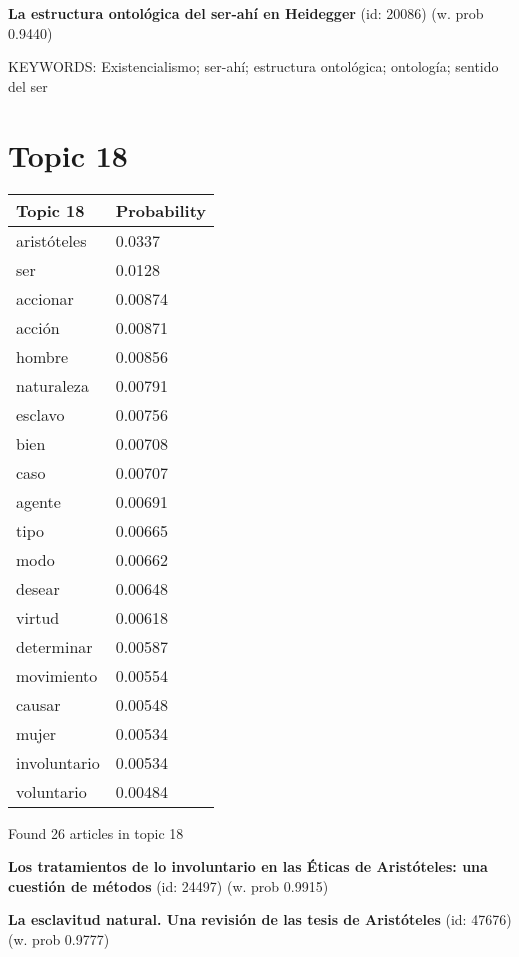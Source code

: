 \documentclass{article}
\begin{document}
\textbf{La estructura ontológica del ser-ahí en Heidegger} (id: 20086)
 (w. prob 0.9440)


KEYWORDS:
Existencialismo; ser-ahí; estructura ontológica; ontología; sentido del ser

\vfill
\newpage


\centering
\thispagestyle{empty}
\section*{Topic 18}\vfill
\begin{tabular}{ll}
\toprule
     Topic 18 & Probability \\
\midrule
  aristóteles &      0.0337 \\
          ser &      0.0128 \\
     accionar &     0.00874 \\
       acción &     0.00871 \\
       hombre &     0.00856 \\
   naturaleza &     0.00791 \\
      esclavo &     0.00756 \\
         bien &     0.00708 \\
         caso &     0.00707 \\
       agente &     0.00691 \\
         tipo &     0.00665 \\
         modo &     0.00662 \\
       desear &     0.00648 \\
       virtud &     0.00618 \\
   determinar &     0.00587 \\
   movimiento &     0.00554 \\
       causar &     0.00548 \\
        mujer &     0.00534 \\
 involuntario &     0.00534 \\
   voluntario &     0.00484 \\
\bottomrule
\end{tabular}

\vfill
Found 26 articles in topic 18
\vfill

\textbf{Los tratamientos de lo involuntario en las Éticas de Aristóteles: una cuestión de métodos} (id: 24497)
 (w. prob 0.9915)
\vfill

\textbf{La esclavitud natural. Una revisión de las tesis de Aristóteles} (id: 47676)
 (w. prob 0.9777)
\vfill
\end{document}

